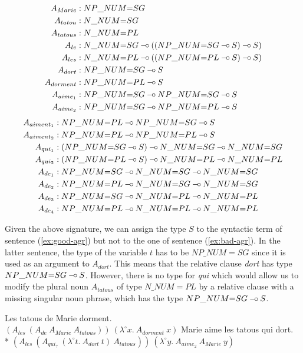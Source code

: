 \begin{align*}
A_{Marie} &: NP\_NUM{=}SG \\
A_{tatou} &: N\_NUM{=}SG \\
A_{tatous} &: N\_NUM{=}PL \\
A_{le} &: N\_NUM{=}SG \limp ((NP\_NUM{=}SG \limp S) \limp S) \\
A_{les} &: N\_NUM{=}PL \limp ((NP\_NUM{=}PL \limp S) \limp S) \\
A_{dort} &: NP\_NUM{=}SG \limp S \\
A_{dorment} &: NP\_NUM{=}PL \limp S \\
A_{aime_1} &: NP\_NUM{=}SG \limp NP\_NUM{=}SG \limp S \\
A_{aime_2} &: NP\_NUM{=}SG \limp NP\_NUM{=}PL \limp S \\
\end{align*}
\begin{align*}
A_{aiment_1} &: NP\_NUM{=}PL \limp NP\_NUM{=}SG \limp S \\
A_{aiment_2} &: NP\_NUM{=}PL \limp NP\_NUM{=}PL \limp S \\
A_{qui_1} &: (NP\_NUM{=}SG \limp S) \limp N\_NUM{=}SG \limp N\_NUM{=}SG \\
A_{qui_2} &: (NP\_NUM{=}PL \limp S) \limp N\_NUM{=}PL \limp N\_NUM{=}PL \\
A_{de_1} &: NP\_NUM{=}SG \limp N\_NUM{=}SG \limp N\_NUM{=}SG \\
A_{de_2} &: NP\_NUM{=}PL \limp N\_NUM{=}SG \limp N\_NUM{=}SG \\
A_{de_3} &: NP\_NUM{=}SG \limp N\_NUM{=}PL \limp N\_NUM{=}PL \\
A_{de_4} &: NP\_NUM{=}PL \limp N\_NUM{=}PL \limp N\_NUM{=}PL
\end{align*}

Given the above signature, we can assign the type $S$ to the syntactic
term of sentence (\ref{ex:good-agr}) but not to the one of sentence
(\ref{ex:bad-agr}). In the latter sentence, the type of the variable $t$
has to be $NP\_NUM{=}SG$ since it is used as an argument to
$A_{dort}$. This means that the relative clause \emph{dort} has type
$NP\_NUM{=}SG \mathbin{{-}\mkern-3.5mu{\circ}} S$. However, there is no type for \emph{qui} which
would allow us to modify the plural noun $A_{tatous}$ of type
$N\_NUM{=}PL$ by a relative clause with a missing singular noun phrase,
which has the type $NP\_NUM{=}SG \mathbin{{-}\mkern-3.5mu{\circ}} S$.

\begin{exe}
  \ex \label{ex:good-agr} Les tatous de Marie dorment. \\
      $(A_{les}\ (A_{de}\ A_{Marie}\ A_{tatous}))\ (\lambda^{\circ} x.\ A_{dorment}\ x)$
  \ex * \label{ex:bad-agr} Marie aime les tatous qui dort. \\
      * $(A_{les}\ (A_{qui_?}\ (\lambda^{\circ} t.\ A_{dort}\ t)\ A_{tatous}))\ (\lambda^{\circ} y.\ A_{aime_2}\ A_{Marie}\ y)$
\end{exe}

